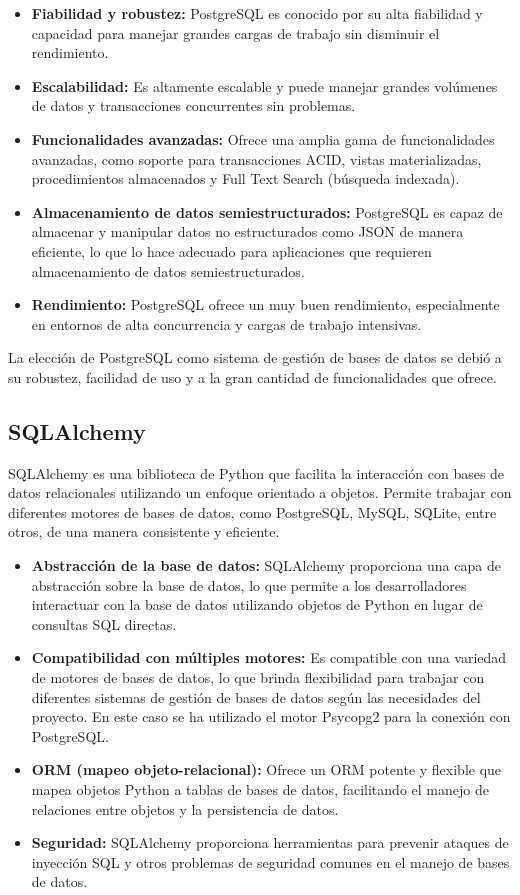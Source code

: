 \begin{itemize}
	\item \textbf{Fiabilidad y robustez:} PostgreSQL es conocido por su alta fiabilidad y capacidad para manejar grandes cargas de trabajo sin disminuir el rendimiento.
	\item \textbf{Escalabilidad:} Es altamente escalable y puede manejar grandes volúmenes de datos y transacciones concurrentes sin problemas.
	\item \textbf{Funcionalidades avanzadas:} Ofrece una amplia gama de funcionalidades avanzadas, como soporte para transacciones ACID, vistas materializadas, procedimientos almacenados y Full Text Search (búsqueda indexada).
	\item \textbf{Almacenamiento de datos semiestructurados:} PostgreSQL es capaz de almacenar y manipular datos no estructurados como JSON de manera eficiente, lo que lo hace adecuado para aplicaciones que requieren almacenamiento de datos semiestructurados.
	\item \textbf{Rendimiento:} PostgreSQL ofrece un muy buen rendimiento, especialmente en entornos de alta concurrencia y cargas de trabajo intensivas.
\end{itemize}

\noindent La elección de PostgreSQL como sistema de gestión de bases de datos se debió a su robustez, facilidad de uso y a la gran cantidad de funcionalidades que ofrece.

\subsection{SQLAlchemy}
SQLAlchemy es una biblioteca de Python que facilita la interacción con bases de datos relacionales utilizando un enfoque orientado a objetos. Permite trabajar con diferentes motores de bases de datos, como PostgreSQL, MySQL, SQLite, entre otros, de una manera consistente y eficiente.

\begin{itemize}
	\item \textbf{Abstracción de la base de datos:} SQLAlchemy proporciona una capa de abstracción sobre la base de datos, lo que permite a los desarrolladores interactuar con la base de datos utilizando objetos de Python en lugar de consultas SQL directas.
	\item \textbf{Compatibilidad con múltiples motores:} Es compatible con una variedad de motores de bases de datos, lo que brinda flexibilidad para trabajar con diferentes sistemas de gestión de bases de datos según las necesidades del proyecto. En este caso se ha utilizado el motor Psycopg2 para la conexión con PostgreSQL.
	\item \textbf{ORM (mapeo objeto-relacional):} Ofrece un ORM potente y flexible que mapea objetos Python a tablas de bases de datos, facilitando el manejo de relaciones entre objetos y la persistencia de datos.
	\item \textbf{Seguridad:} SQLAlchemy proporciona herramientas para prevenir ataques de inyección SQL y otros problemas de seguridad comunes en el manejo de bases de datos.
\end{itemize}

